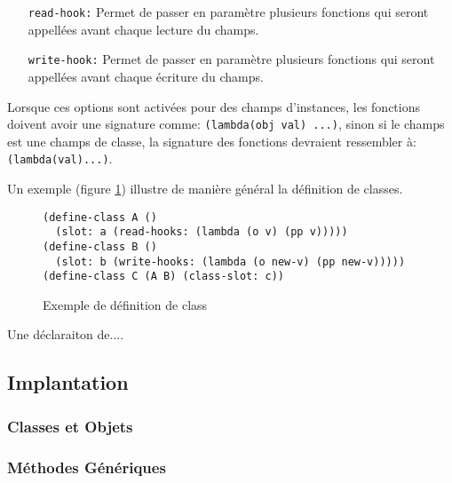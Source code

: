 \documentclass[letterpaper,12pt]{article}
\begin{document}
      \begin{itemize}
      \item[\texttt{read-hook:}] Permet de passer en paramètre
        plusieurs fonctions qui seront appellées avant chaque lecture
        du champs.
      \item[\texttt{write-hook:}] Permet de passer en paramètre
        plusieurs fonctions qui seront appellées avant chaque écriture
        du champs.
      \end{itemize}

      Lorsque ces options sont activées pour des champs d'instances,
      les fonctions doivent avoir une signature comme:
      \texttt{(lambda(obj val) ...)}, sinon si le champs est une
      champs de classe, la signature des fonctions devraient
      ressembler à: \texttt{(lambda(val)...)}.

      Un exemple (figure \ref{ex-defclass}) illustre de manière
      général la définition de classes.

      \begin{figure}[htbp!]
        \begin{lstlisting}
(define-class A () 
  (slot: a (read-hooks: (lambda (o v) (pp v)))))
(define-class B () 
  (slot: b (write-hooks: (lambda (o new-v) (pp new-v)))))
(define-class C (A B) (class-slot: c))
        \end{lstlisting}
        \caption{Exemple de définition de class}
        \label{ex-defclass}
      \end{figure}

      Une déclaraiton de....

\clearpage



\subsection{Implantation}

\subsubsection{Classes et Objets}

\subsubsection{Méthodes Génériques}


\clearpage

\end{document}
